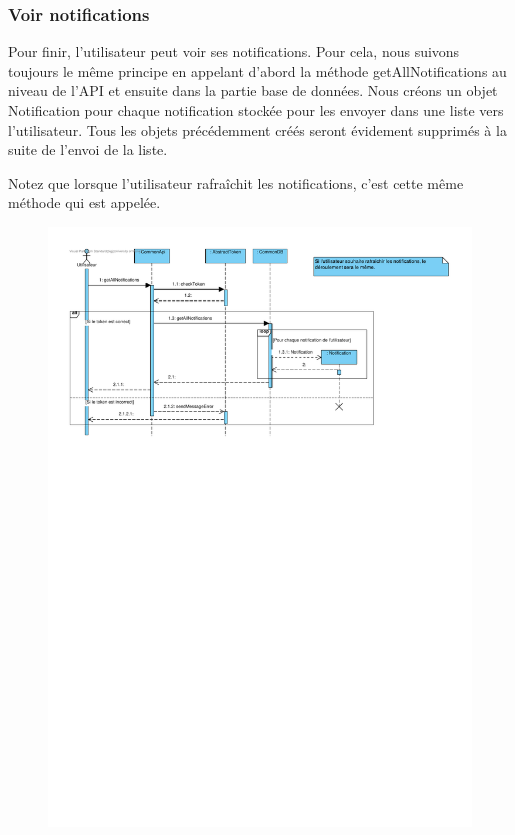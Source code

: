 \newpage

\subsubsection{Voir notifications}

\begin{flushleft}
Pour finir, l'utilisateur peut voir ses notifications. Pour cela, nous suivons toujours le même principe en appelant d'abord la méthode getAllNotifications au niveau de l'API et ensuite dans la partie base de données. Nous créons un objet Notification pour chaque notification stockée pour les envoyer dans une liste vers l'utilisateur. Tous les objets précédemment créés seront évidement supprimés à la suite de l'envoi de la liste.
\end{flushleft}

\begin{flushleft}
Notez que lorsque l'utilisateur rafraîchit les notifications, c'est cette même méthode qui est appelée.
\end{flushleft}

\begin{figure}[h]
\centering
\includegraphics[height = 1\textwidth]{Base/sequence/img/common/Voir notifications.pdf}
\end{figure}

